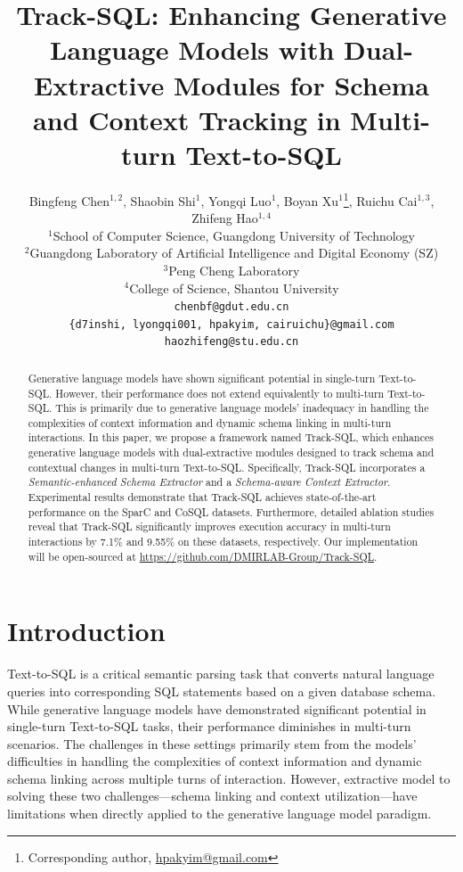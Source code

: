 \documentclass[11pt]{article}
\title{Track-SQL: Enhancing Generative Language Models with Dual-Extractive Modules for Schema and Context Tracking in Multi-turn Text-to-SQL}
\author{
    Bingfeng Chen$^{1,2}$, Shaobin Shi$^{1}$, Yongqi Luo$^{1}$, Boyan Xu$^{1}$\thanks{Corresponding author, \href{mailto:hpakyim@gmail.com}{hpakyim@gmail.com}}, Ruichu Cai$^{1,3}$, Zhifeng Hao$^{1,4}$ \\
    $^{1}$School of Computer Science, Guangdong University of Technology \\
    $^{2}$Guangdong Laboratory of Artificial Intelligence and Digital Economy (SZ) \\
    $^{3}$Peng Cheng Laboratory \\
    $^{4}$College of Science, Shantou University \\
    \texttt{chenbf@gdut.edu.cn} \\
    \texttt{\{d7inshi, lyongqi001, hpakyim, cairuichu\}@gmail.com} \\
    \texttt{haozhifeng@stu.edu.cn} \\
}
\begin{document}
\maketitle

\begin{abstract}
Generative language models have shown significant potential in single-turn Text-to-SQL. However, their performance does not extend equivalently to multi-turn Text-to-SQL. This is primarily due to generative language models' inadequacy in handling the complexities of context information and dynamic schema linking in multi-turn interactions. In this paper, we propose a framework named Track-SQL, which enhances generative language models with dual-extractive modules designed to track schema and contextual changes in multi-turn Text-to-SQL. Specifically, Track-SQL incorporates a \emph{Semantic-enhanced Schema Extractor} and a \emph{Schema-aware Context Extractor}. Experimental results demonstrate that Track-SQL achieves state-of-the-art performance on the SparC and CoSQL datasets. Furthermore, detailed ablation studies reveal that Track-SQL significantly improves execution accuracy in multi-turn interactions by 7.1\% and 9.55\% on these datasets, respectively. Our implementation will be open-sourced at \url{https://github.com/DMIRLAB-Group/Track-SQL}.
\end{abstract}

\section{Introduction}
Text-to-SQL \cite{zhong2017seq2sqlgeneratingstructuredqueries} is a critical semantic parsing task that converts natural language queries into corresponding SQL statements based on a given database schema.  
While generative language models have demonstrated significant potential in single-turn Text-to-SQL tasks, their performance diminishes in multi-turn scenarios. The challenges in these settings primarily stem from the models' difficulties in handling the complexities of context information and dynamic schema linking across multiple turns of interaction. However, extractive model to solving these two challenges—schema linking and context utilization—have limitations when directly applied to the generative language model paradigm.
\end{document}
